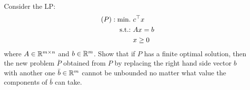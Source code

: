 \noindent Consider the LP:
\begin{align*}
	(P) : \mathop{\text{min.~}} & c^\top x \\
	\mathop{\text{s.t.:~}} & Ax = b \\
				& x \ge 0
\end{align*}
where $A \in \mathbb{R}^{m \times n}$ and $b \in \mathbb{R}^m$. Show that if $P$ has a finite optimal solution, then the new problem $\overline{P}$ obtained from $P$ by replacing the right hand side vector $b$ with another one $\bar{b} \in \mathbb{R}^m$ cannot be unbounded no matter what value the components of $\bar{b}$ can take.
